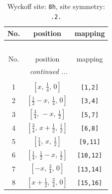 \documentclass[fleqn,8pt]{jsarticle}
\begin{document}
\begin{longtable}{ccc}
\caption{Wyckoff site: {\tt 8h}, site symmetry: {\tt .2.}}
 \\
 \hline \hline
No. & position & mapping \\ \hline \endfirsthead

\multicolumn{2}{l}{\tablename\ \thetable{}} \\
 \hline \hline
No. & position & mapping \\ \hline \endhead

 \hline \hline
\multicolumn{2}{r}{\footnotesize\it continued ...} \\ \endfoot

 \hline \hline
\multicolumn{2}{r}{} \\ \endlastfoot

1 & $\left[ x,\, \frac{1}{4},\, 0 \right]$ & {\tt [1,2]} \\ \hline
2 & $\left[ \frac{1}{2} - x,\, \frac{1}{4},\, 0 \right]$ & {\tt [3,4]} \\ \hline
3 & $\left[ \frac{3}{4},\, - x,\, \frac{1}{2} \right]$ & {\tt [5,7]} \\ \hline
4 & $\left[ \frac{3}{4},\, x + \frac{1}{2},\, \frac{1}{2} \right]$ & {\tt [6,8]} \\ \hline
5 & $\left[ \frac{1}{4},\, x,\, \frac{1}{2} \right]$ & {\tt [9,11]} \\ \hline
6 & $\left[ \frac{1}{4},\, \frac{1}{2} - x,\, \frac{1}{2} \right]$ & {\tt [10,12]} \\ \hline
7 & $\left[ - x,\, \frac{3}{4},\, 0 \right]$ & {\tt [13,14]} \\ \hline
8 & $\left[ x + \frac{1}{2},\, \frac{3}{4},\, 0 \right]$ & {\tt [15,16]} \\
\end{longtable}
\renewcommand{\arraystretch}{1.2}
\end{document}

